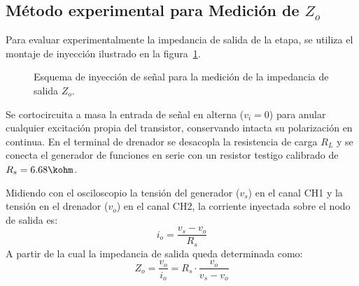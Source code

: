 \subsection{Método experimental para Medición de \texorpdfstring{$Z_o$}{Zo} }
Para evaluar experimentalmente la impedancia de salida de la etapa, se utiliza el montaje de inyección ilustrado en la
figura~\ref{crkt:medicion_zo}.

\begin{figure}[!ht]
  \centering
  
  \caption{Esquema de inyección de señal para la medición de la impedancia de salida $Z_o$.}
  \label{crkt:medicion_zo}
\end{figure}

Se cortocircuita a masa la entrada de señal en alterna ($v_i = 0$) para anular cualquier excitación propia del
transistor, conservando intacta su polarización en continua. En el terminal de drenador se desacopla la resistencia de
carga $R_L$ y se conecta el generador de funciones en serie con un resistor testigo calibrado de $R_s = 6.68\kohm$.

Midiendo con el osciloscopio la tensión del generador ($v_s$) en el canal CH1 y la tensión en el drenador ($v_o$) en el
canal CH2, la corriente inyectada sobre el nodo de salida es:
\begin{equation}
  i_o = \frac{v_s - v_o}{R_s}
  \label{eq:io_medicion}
\end{equation}
A partir de la cual la impedancia de salida queda determinada como:
\begin{equation}
  Z_o = \frac{v_o}{i_o} = R_s \cdot \frac{v_o}{v_s - v_o}
  \label{eq:Zo_medicion}
\end{equation}
